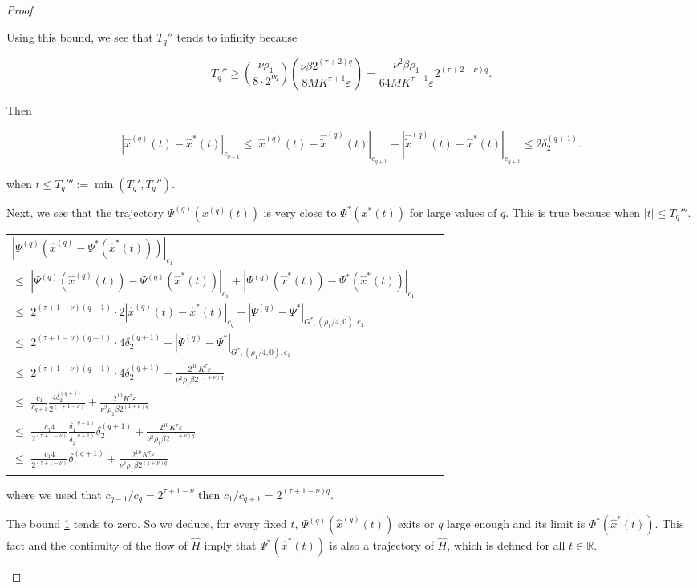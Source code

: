 \begin{proof}
\begin{enumerate}
Using this bound, we see that $T_q''$ tends to infinity because

$$T_q'' \geq \left(\frac{\nu \rho_1}{8\cdot 2^{\nu q}}\right)\left(\frac{\nu \beta 2^{(\tau+2)q}}{8 M K^{\tau+1}\varepsilon}\right) = \frac{\nu^2 \beta \rho_1}{64 M K^{\tau+1}\varepsilon} 2^{(\tau+2-\nu)q}.$$

Then

$$ |\hat x^{(q)}(t) - \hat x^* (t)|_{c_{q+1}} \leq |\hat x^{(q)}(t) - \hat{\tilde x}^{(q)}(t)|_{c_{q+1}} + |\hat{\tilde x}^{(q)}(t) - \hat x^* (t)|_{c_{q+1}} \leq 2 \delta_2^{(q+1)}.$$

when $t \leq T_q''':= \min(T_q', T_q'')$.

Next, we see that the trajectory $\Psi^{(q)}(x^{(q)}(t))$ is very close to $\Psi^*(x^*(t))$ for large values of $q$. This is true because when $|t| \leq T_q'''$.

\begin{longtable}{lcl}\label{eq:inv_tor_1}
$|\Psi^{(q)}(\hat x^{(q)} - \Psi^* (\hat x^* (t)))|_{c_1}$\\
 $\leq$  $|\Psi^{(q)}(\hat x^{(q)}(t)) - \Psi^{(q)}(\hat x^* (t))|_{c_1} + |\Psi^{(q)}(\hat x^*(t)) - \Psi^* (\hat x^* (t))|_{c_1}$\\
 $\leq$  $2^{(\tau+1-\nu)(q-1)}\cdot 2|\hat x^{(q)}(t) - \hat x^* (t)|_{c_q} + |\Psi^{(q)} - \Psi^*|_{G^* , (\rho_1/4,0),c_1}$\\
 $\leq$  $2^{(\tau+1-\nu)(q-1)}\cdot 4 \delta_2^{(q+1)} + |\Psi^{(q)} - \Psi^*|_{G^*,(\rho_1/4,0),c_1}$\\
 $\leq$  $2^{(\tau+1-\nu)(q-1)}\cdot 4 \delta_2^{(q+1)} + \frac{2^{10} K^\tau \varepsilon}{\nu^2\rho_1\beta 2^{(1+\nu)q}}$\\
 $\leq$  $\frac{c_1}{c_{q+1}}\frac{4\delta_2^{(q+1)}}{2^{(\tau+1-\nu)}} + \frac{2^{10} K^\tau \varepsilon}{\nu^2\rho_1\beta 2^{(1+\nu)q}}$\\
 $\leq$  $\frac{c_1 4}{2^{(\tau+1-\nu)}}\frac{\delta_1^{(q+1)}}{\delta_2^{(q+1)}}\delta_2^{(q+1)} + \frac{2^{10} K^\tau \varepsilon}{\nu^2\rho_1\beta 2^{(1+\nu)q}}$\\
 $\leq$  $\frac{c_1 4}{2^{(\tau+1-\nu)}}\delta_1^{(q+1)} + \frac{2^{10} K^\tau \varepsilon}{\nu^2\rho_1\beta 2^{(1+\nu)q}}$\\
\end{longtable}

where we used that $c_{q-1}/c_q = 2^{\tau+1-\nu}$ then $c_1/c_{q+1} = 2^{(\tau+1-\nu)q}$.

The bound \ref{eq:inv_tor_1} tends to zero. So we deduce, for every fixed $t$, $\Psi^{(q)}(\hat x^{(q)}(t))$ exits or $q$ large enough and its limit is $\Phi^* (\hat x^* (t))$.
This fact and the continuity of the flow of $\hat H$ imply that $\Psi^* (\hat x^* (t))$ is also a trajectory of $\hat H$, which is defined for all $t\in\mathbb{R}$.


\end{enumerate}
\end{proof}
